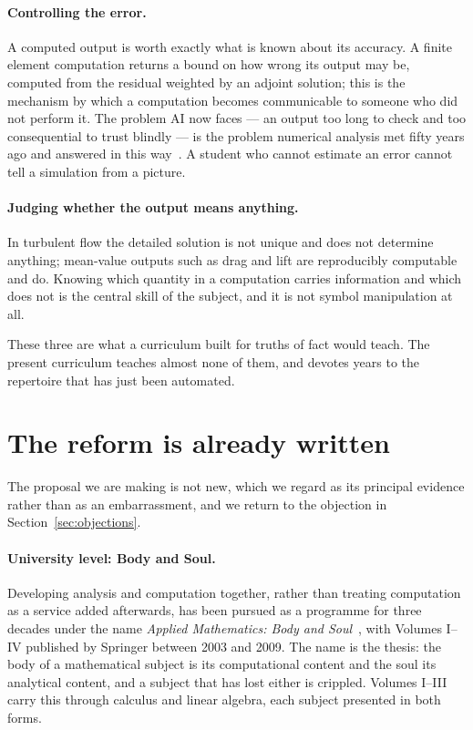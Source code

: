 \documentclass[11pt]{article}
\begin{document}
\paragraph{Controlling the error.} A computed output is worth exactly what is known about its
accuracy. A finite element computation returns a bound on how wrong its output may be, computed from
the residual weighted by an adjoint solution; this is the mechanism by which a computation becomes
communicable to someone who did not perform it. The problem AI now faces --- an output too long to
check and too consequential to trust blindly --- is the problem numerical analysis met fifty years
ago and answered in this way~\cite{aivsna}. A student who cannot estimate an error cannot tell a
simulation from a picture.

\paragraph{Judging whether the output means anything.} In turbulent flow the detailed solution is not
unique and does not determine anything; mean-value outputs such as drag and lift are reproducibly
computable and do. Knowing which quantity in a computation carries information and which does not is
the central skill of the subject, and it is not symbol manipulation at all.

These three are what a curriculum built for truths of fact would teach. The present curriculum
teaches almost none of them, and devotes years to the repertoire that has just been automated.

\section{The reform is already written}\label{sec:written}

The proposal we are making is not new, which we regard as its principal evidence rather than as an
embarrassment, and we return to the objection in Section~\ref{sec:objections}.

\paragraph{University level: Body and Soul.} Developing analysis and computation together, rather
than treating computation as a service added afterwards, has been pursued as a programme for three
decades under the name \emph{Applied Mathematics: Body and Soul}~\cite{bodysoul,bsbooks}, with
Volumes I--IV published by Springer between 2003 and 2009. The name is the thesis: the body of a
mathematical subject is its computational content and the soul its analytical content, and a subject
that has lost either is crippled. Volumes I--III carry this through calculus and linear algebra,
each subject presented in both forms.
\end{document}
